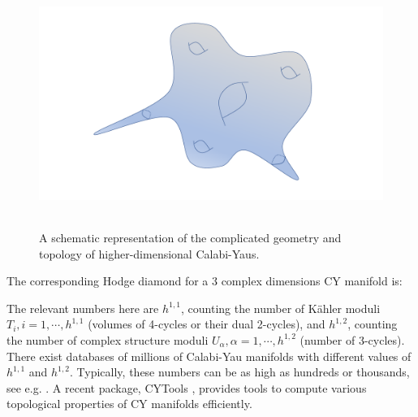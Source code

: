 \begin{figure}[t]
\begin{center}
\includegraphics[width=120mm,height=80mm]{Sections/Figures/CalabiYau2.pdf} 
\caption{A schematic representation of the complicated geometry and topology of higher-dimensional Calabi-Yaus.} \label{Fig:CY2} 
\end{center}
\end{figure}

The corresponding Hodge diamond for a 3 complex dimensions CY manifold is:
\bea
\setlength\fboxsep{0.25cm}
\setlength\fboxrule{0.4pt}
\nonumber
\eea

The relevant numbers here are $h^{1,1}$, counting the number of K\"ahler moduli $T_i, i=1, \cdots, h^{1,1}$ (volumes of 4-cycles or their dual 2-cycles), and $h^{1,2}$, counting the number of complex structure moduli $U_\alpha, \alpha=1,\cdots, h^{1,2}$ (number of 3-cycles). There exist databases of millions of Calabi-Yau manifolds with different values of $h^{1,1}$ and $h^{1,2}$. Typically, these numbers can be as high as hundreds or thousands, see e.g.  \cite{Kreuzer:2000xy}. A recent package, CYTools \cite{Demirtas:2022hqf}, provides tools to compute various topological properties of CY manifolds efficiently.

